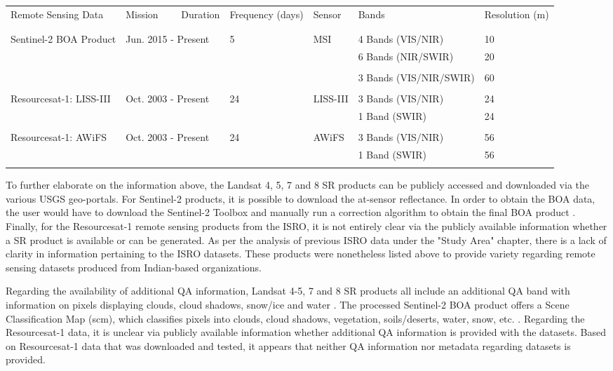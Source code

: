 \begin{ThreePartTable}
\begin{longtable}{L{2.7cm} L{2cm} L{1.7cm} L{2cm} L{3.4cm} L{1.65cm}}
			Remote Sensing Data & Mission ~~~~Duration & Frequency (days) & Sensor & Bands & Resolution (m) \\\\[-0.4cm]
			\midrule[0.35mm]\\[-0.25cm]
			Sentinel-2 BOA Product & Jun. 2015 - Present & 5 & MSI & 4 Bands (VIS/NIR) & 10 \\
			&&&& 6 Bands (NIR/SWIR) & 20 \\\\[-0.3cm]
			&&&& 3 Bands (VIS/NIR/SWIR) & 60 \\\\[-0.05cm]
			Resourcesat-1: LISS-III & Oct. 2003 - Present & 24 & LISS-III & 3 Bands (VIS/NIR) & 24 \\
			&&&& 1 Band (SWIR) & 24 \\\\
			Resourcesat-1: AWiFS & Oct. 2003 - Present & 24 & AWiFS & 3 Bands (VIS/NIR) & 56 \\
			&&&& 1 Band (SWIR) & 56 \\\\[-0.2cm]
			\bottomrule[0.25mm]
		\end{longtable}
	 \end{ThreePartTable}

\justify
To further elaborate on the information above, the Landsat 4, 5, 7 and 8 SR products can be publicly accessed and downloaded via the various USGS geo-portals. For Sentinel-2 products, it is possible to download the at-sensor reflectance. In order to obtain the BOA data, the user would have to download the Sentinel-2 Toolbox and manually run a correction algorithm to obtain the final BOA product . Finally, for the Resourcesat-1 remote sensing products from the ISRO, it is not entirely clear via the publicly available information whether a SR product is available or can be generated. As per the analysis of previous ISRO data under the "Study Area" chapter, there is a lack of clarity in information pertaining to the ISRO datasets. These products were nonetheless listed above to provide variety regarding remote sensing datasets produced from Indian-based organizations.

\justify
Regarding the availability of additional QA information, Landsat 4-5, 7 and 8 SR products all include an additional QA band with information on pixels displaying clouds, cloud shadows, snow/ice and water \citep{landsat2006, landsat2016}. The processed Sentinel-2 BOA product offers a Scene Classification Map (\ac{scm}), which classifies pixels into clouds, cloud shadows, vegetation, soils/deserts, water, snow, etc. . Regarding the Resourcesat-1 data, it is unclear via publicly available information whether additional QA information is provided with the datasets. Based on Resourcesat-1 data that was downloaded and tested, it appears that neither QA information nor metadata regarding datasets is provided.

